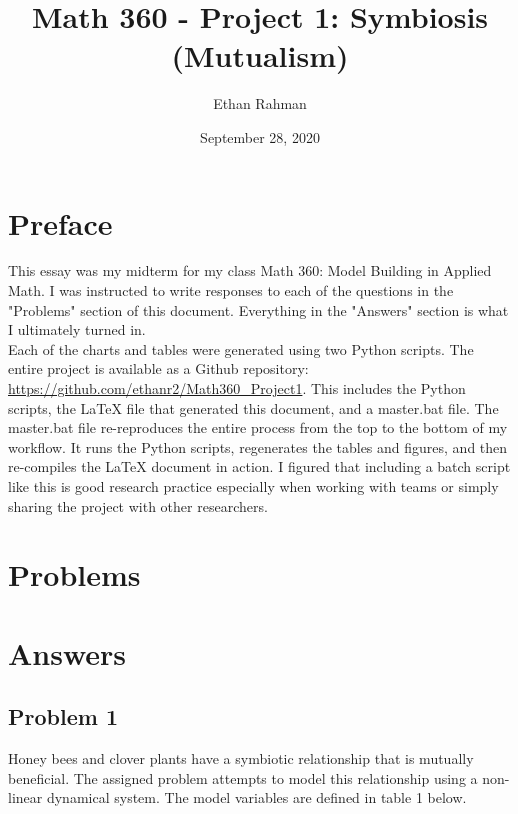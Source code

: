 \documentclass[12pt,a4paper,titlepage]{report}
\date{September 28, 2020}
\title{Math 360 - Project 1: Symbiosis (Mutualism)}
\author{Ethan Rahman}
\begin{document}
	\maketitle
	\tableofcontents
	\pagebreak
	\chapter*{Preface}
	
	This essay was my midterm for my class Math 360: Model Building in Applied Math. I was instructed to write responses to each of the questions in the "Problems" section of this document. Everything in the "Answers" section is what I ultimately turned in. \\
	
	Each of the charts and tables were generated using two Python scripts. The entire project is available as a Github repository: \url{https://github.com/ethanr2/Math360_Project1}. This includes the Python scripts, the LaTeX file that generated this document, and a master.bat file. The master.bat file re-reproduces the entire process from the top to the bottom of my workflow. It runs the Python scripts, regenerates the tables and figures, and then re-compiles the LaTeX document in action. I figured that including a batch script like this is good research practice especially when working with teams or simply sharing the project with other researchers.
	\pagebreak
	\chapter*{Problems}
	
	\chapter*{Answers}
	
	\section*{Problem 1}
		Honey bees and clover plants have a symbiotic relationship that is mutually beneficial. The assigned problem attempts to model this relationship using a non-linear dynamical system. The model variables are defined in table 1 below.
	
\end{document}
